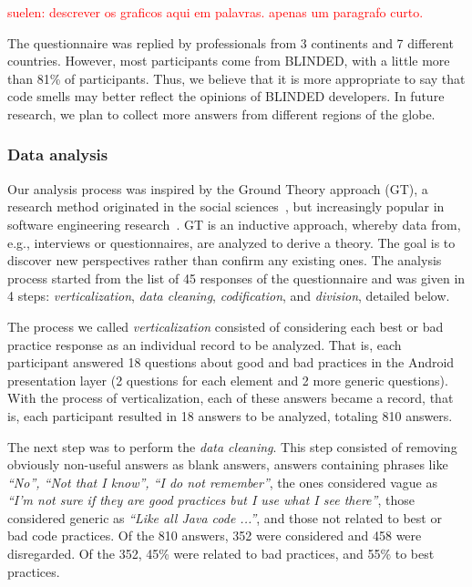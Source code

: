 \textcolor{red}{suelen: descrever os graficos aqui em palavras. apenas um paragrafo curto.}

The questionnaire was replied by professionals from 3 continents and 7 different countries.
However, most participants come from BLINDED, with a little more than 81\% of participants.
Thus, we believe that it is more appropriate to say that code smells may better reflect the opinions of BLINDED developers. In future research, we plan to collect more answers from
different regions of the globe.

\subsubsection{Data analysis}
\label{etapa-1-analise}

Our analysis process was inspired by the Ground Theory approach (GT), a research method originated in the social sciences~\cite{Strauss2007, GlaserStrauss1999}, but increasingly popular in software engineering research~\cite{Adolph2011}. 
GT is an inductive approach, whereby data from, e.g., interviews or questionnaires, are analyzed to derive a theory. The goal is to discover new perspectives rather than confirm any existing ones. The analysis process started from the list of 45 responses of the questionnaire and was given in 4 steps: \textit{verticalization}, \textit {data cleaning}, \textit {codification}, and \textit {division}, detailed below.

The process we called \textit{verticalization} consisted of considering each best or bad practice response as an individual record to be analyzed. That is, each participant answered 18 questions about good and bad practices in the Android presentation layer (2 questions for each element and 2 more generic questions). With the process of verticalization, each of these answers became a record, that is, each participant resulted in 18 answers to be analyzed, totaling 810 answers.

The next step was to perform the \textit{data cleaning}. This step consisted of removing obviously non-useful answers as blank answers, answers containing phrases like \textit{``No'', ``Not that I know'', ``I do not remember''}, the ones considered vague as \textit{``I'm not sure if they are good practices but I use what I see there''}, those considered generic as \textit{``Like all Java code ...''}, and those not related to best or bad code practices. Of the 810 answers, 352 were considered and 458 were disregarded. Of the 352, 45\% were related to bad practices, and 55\% to best practices.

